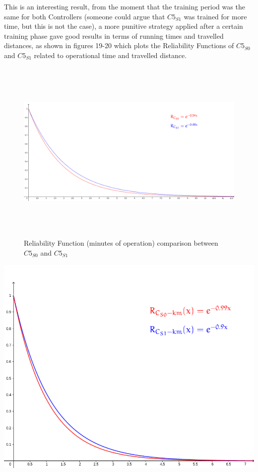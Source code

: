 This is an interesting result, from the moment that the training period was the same for both Controllers (someone could argue that $C5_{S1}$ was trained for more time, but this is not the case), a more punitive strategy applied after a certain training phase gave good results in terms of running times and travelled distances, as shown in figures 19-20 which plots the Reliability Functions of $C5_{S0}$ and $C5_{S1}$ related to operational time and travelled distance.

\vspace{0.5cm}

\begin{figure}[h!]
	\includegraphics[width=\textwidth, height=9cm]{img/reliability-pro-stupid-comparison.png}
	\caption{Reliability Function (minutes of operation) comparison between $C5_{S0}$ and $C5_{S1}$}
\end{figure}

\begin{minipage}[c]{\textwidth}
	\includegraphics[width=\textwidth]{img/reliability-pro-stupid-km-comparison.png}
\end{minipage}


